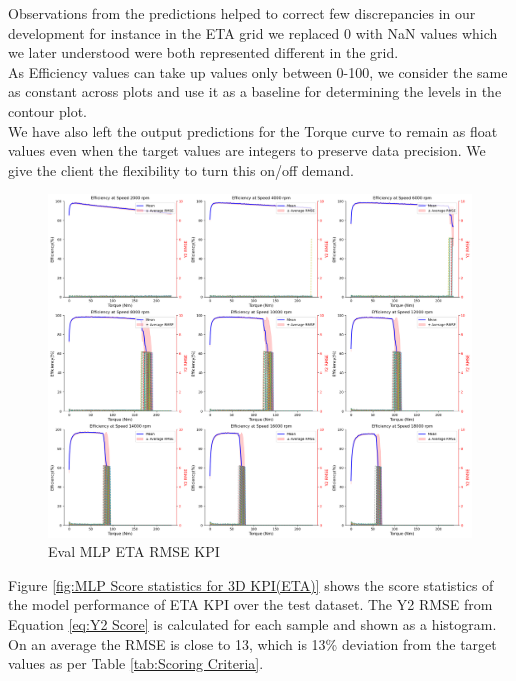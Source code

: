 \documentclass{report} %
\begin{document}
Observations from the predictions helped to correct few discrepancies in our development for instance in the ETA grid we replaced 0 with \ac{NaN} values which we later understood were both represented different in the grid.\\
As Efficiency values can take up values only between 0-100, we consider the same as constant across plots and use it as a baseline for determining the levels in the contour plot. \\ 
We have also left the output predictions for the Torque curve to remain as float values even when the target values are integers to preserve data precision. We give the client the flexibility to turn this on/off demand. \\

\begin{figure}[H]
    \centering
    \includegraphics[width=1\textwidth]{./ReportImages/rmse_eta_MLP.png} 
    \caption{Eval MLP ETA \ac{RMSE} \ac{KPI}} 
    \label{fig:Eval MLP ETA RMSE KPI}
\end{figure}

Figure \ref{fig:MLP Score statistics for 3D KPI(ETA)} shows the score statistics of the model performance of ETA \ac{KPI} over the test dataset.
The Y2 \ac{RMSE} from Equation \ref{eq:Y2 Score} is calculated for each sample and shown as a histogram.\\
On an average the \ac{RMSE} is close to 13, which is 13\% deviation from the target values as per Table \ref{tab:Scoring Criteria}.\\
\end{document}
